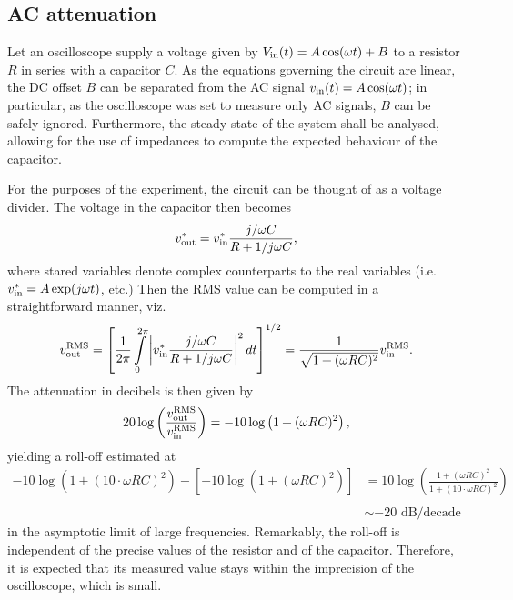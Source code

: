 \documentclass{article}
\begin{document}
\subsection{AC attenuation}
Let an oscilloscope supply a voltage given by $V_{\text{in}}(t) = A\cos(\omega t) + B$ to a resistor $R$ in series with a capacitor $C$. As the equations governing the circuit are linear, the DC offset $B$ can be separated from the AC signal $v_{\text{in}}(t) = A\cos(\omega t)$; in particular, as the oscilloscope was set to measure only AC signals, $B$ can be safely ignored. Furthermore, the steady state of the system shall be analysed, allowing for the use of impedances to compute the expected behaviour of the capacitor.
\par For the purposes of the experiment, the circuit can be thought of as a voltage divider. The voltage in the capacitor then becomes
\begin{equation*}
    v_{\text{out}}^*= v_{\text{in}}^*\frac{j/\omega C}{R + 1/j\omega C},
\end{equation*}
where stared variables denote complex counterparts to the real variables (i.e. $v_{\text{in}}^* = A\exp(j\omega t)$, etc.) Then the RMS value can be computed in a straightforward manner, viz.
\begin{equation*}
        v_{\text{out}}^{\text{RMS}} = \left[\frac{1}{2\pi}\int\limits_0^{2\pi}\left|v_{\text{in}}^*\frac{j/\omega C}{R + 1/j\omega C}\right|^2dt\right]^{1/2} = \frac{1}{\sqrt{1 + (\omega RC)^2}} v_{\text{in}}^{\text{RMS}}.
\end{equation*}
The attenuation in decibels is then given by
\begin{equation}
    20\log\left(\frac{v_{\text{out}}^{\text{RMS}}}{v_{\text{in}}^{\text{RMS}}}\right) = -10\log\left(1 + (\omega RC)^2\right),
    \label{eqn:ac_plot}
\end{equation}
yielding a roll-off estimated at
\begin{equation}
\begin{split}
        -10\log\left(1 + (10\cdot\omega RC)^2\right) - \left[-10\log\left(1 + (\omega RC)^2\right)\right] &= 10\log \left(\frac{1 + (\omega RC)^2}{1 + (10\cdot\omega RC)^2} \right)\\
        \\
        &\sim-20 \text{ dB/decade}
\end{split}
\label{eqn:roll_off}
\end{equation}
in the asymptotic limit of large frequencies. Remarkably, the roll-off is independent of the precise values of the resistor and of the capacitor. Therefore, it is expected that its measured value stays within the imprecision of the oscilloscope, which is small. 
\end{document}

